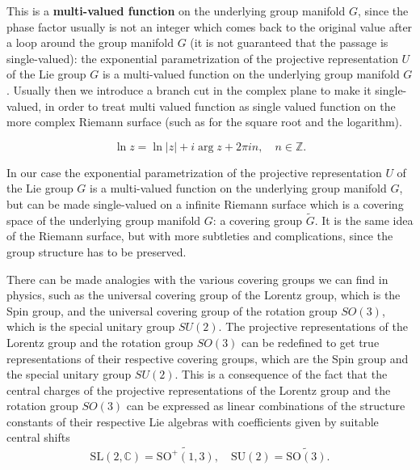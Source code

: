 This is a \textbf{multi-valued function} on the underlying group manifold \(G\), since the phase factor usually is not an integer which comes back to the original value after a loop around the group manifold \(G\) (it is not guaranteed that the passage is single-valued): the exponential parametrization of the projective representation \(U\) of the Lie group \(G\) is a multi-valued function on the underlying group manifold \(G\). Usually then we introduce a branch cut in the complex plane to make it single-valued, in order to treat multi valued function as single valued function on the more complex Riemann surface (such as for the square root and the logarithm).

\[
    \ln z = \ln \vert z \vert  + i \arg z + 2 \pi i n, \quad n \in \mathbb{Z}.
\]

In our case the exponential parametrization of the projective representation \(U\) of the Lie group \(G\) is a multi-valued function on the underlying group manifold \(G\), but can be made single-valued on a infinite Riemann surface which is a covering space of the underlying group manifold \(G\): a covering group \(\tilde{G}\). It is the same idea of the Riemann surface, but with more subtleties and complications, since the group structure has to be preserved.

There can be made analogies with the various covering groups we can find in physics, such as the universal covering group of the Lorentz group, which is the Spin group, and the universal covering group of the rotation group \(SO(3)\), which is the special unitary group \(SU(2)\). The projective representations of the Lorentz group and the rotation group \(SO(3)\) can be redefined to get true representations of their respective covering groups, which are the Spin group and the special unitary group \(SU(2)\). This is a consequence of the fact that the central charges of the projective representations of the Lorentz group and the rotation group \(SO(3)\) can be expressed as linear combinations of the structure constants of their respective Lie algebras with coefficients given by suitable central shifts
\[
    \mathrm{SL}(2, \mathbb{C}) = \widetilde{\mathrm{SO}^+(1,3)}, \quad \mathrm{SU}(2) = \widetilde{\mathrm{SO}(3)}.
\]

